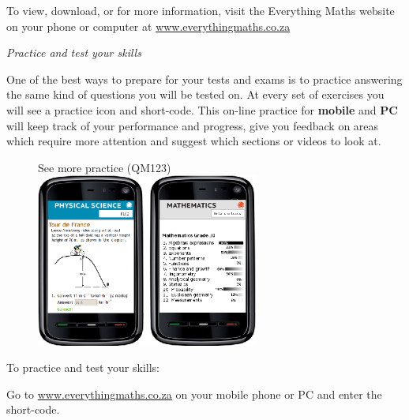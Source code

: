 \newpage
\thispagestyle{empty}
{\Large

To view, download, or for more information, visit the Everything Maths website on your phone or
computer at \underline{www.everythingmaths.co.za}  \par
\vspace*{1cm}
{\normalfont\sffamily\fontsize{22}\normalfont\itshape Practice and test your skills} \par


One of the best ways to prepare for your tests and exams is to practice answering the same kind of
questions you will be tested on. At every set of exercises you will see a practice icon and short-code.
This on-line practice for \textbf{mobile} and \textbf{PC} will keep track of your performance and progress, give you
feedback on areas which require more attention and suggest which sections or videos to look at.

\begin{figure}[h]
\begin{center}
See more practice  (QM123)\\ 
\includegraphics[width=0.65\textwidth]{title_images/practicephones.eps}
\end{center}
\end{figure}
\par



To practice and test your skills:\par

Go to \underline{www.everythingmaths.co.za} on your mobile phone or PC and enter the short-code.\par

}

